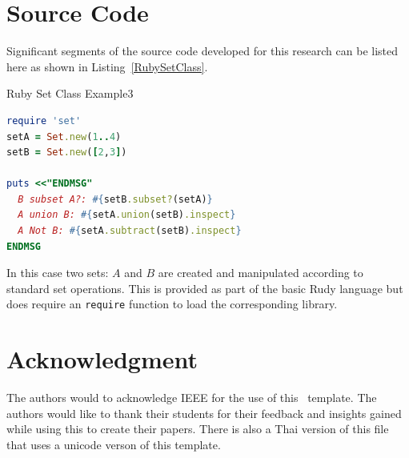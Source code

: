 \documentclass[journal,12pt]{IEEEtran}
\begin{document}
\section{Source Code}
Significant segments of the source code developed for this research can be listed here as shown in Listing~\ref{RubySetClass}. 

\begin{code}
\caption{Ruby Set Class Example3}
\label{RubySetClass}
\begin{lstlisting}[language=Ruby]
require 'set'
setA = Set.new(1..4)
setB = Set.new([2,3])

puts <<"ENDMSG"
  B subset A?: #{setB.subset?(setA)}
  A union B: #{setA.union(setB).inspect}
  A Not B: #{setA.subtract(setB).inspect}
ENDMSG
\end{lstlisting}
\end{code}

In this case two sets: $A$ and $B$ are created and manipulated according to standard set operations. This is provided as part of the basic Rudy language but does require an \verb|require| function to load the corresponding library.

\section*{Acknowledgment}

The authors would to acknowledge IEEE for the use of this \LaTeXe\ template. The authors would like to thank their students for their feedback and insights gained while using this to create their papers. There is also a Thai version of this file that uses a unicode verson of this template.


%

\par\vfill
\end{document}

